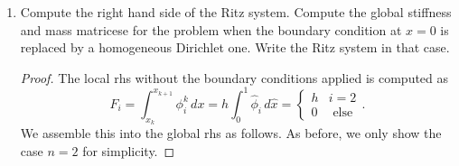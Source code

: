 \documentclass{article}
\begin{document}
\begin{enumerate}
\begin{proof}
		      Using this natural ordering, the global stiffness matrix is assembled with a certain block structure which we explicitly show for $n = 2$.
		      The general case is more or less the same.
		      \begin{equation*}
			      S_{glob} =
			      \begin{pmatrix}
				      S_{11} & S_{12} & S_{13}          & 0      & 0      \\
				      S_{21} & S_{22} & S_{23}          & 0      & 0      \\
				      S_{31} & S_{32} & S_{33} + S_{11} & S_{12} & S_{13} \\
				      0      & 0      & S_{21}          & S_{22} & S_{23} \\
				      0      & 0      & S_{31}          & S_{32} & S_{33}
			      \end{pmatrix}
		      \end{equation*}
		      Similarly, the global mass matrix is assembled as
		      \begin{equation*}
			      M_{glob} =
			      \begin{pmatrix}
				      M_{11} & M_{12} & M_{13}          & 0      & 0      \\
				      M_{21} & M_{22} & M_{23}          & 0      & 0      \\
				      M_{31} & M_{32} & M_{33} + M_{11} & M_{12} & M_{13} \\
				      0      & 0      & M_{21}          & M_{22} & M_{23} \\
				      0      & 0      & M_{31}          & M_{32} & M_{33}
			      \end{pmatrix}
		      \end{equation*}
	      \end{proof}
	\item Compute the right hand side of the Ritz system.
	      Compute the global stiffness and mass matricese for the problem when the boundary condition at $x = 0$ is replaced by a homogeneous Dirichlet one.
	      Write the Ritz system in that case.
	      \begin{proof}
		      The local rhs without the boundary conditions applied is computed as \[F_i = \int_{x_k}^{x_{k+1}}\phi_i^k\,dx = h\int_0^1\widehat\phi_i\,d\widehat x = \begin{cases} h & i = 2 \\ 0 & \text{ else } \end{cases}.\]
		      We assemble this into the global rhs as follows.
		      As before, we only show the case $n = 2$ for simplicity.

\end{proof}
\end{enumerate}
\end{document}
